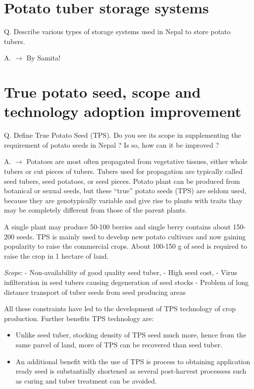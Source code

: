 \documentclass[
]{book}
\providecommand{\tightlist}{%
  \setlength{\itemsep}{0pt}\setlength{\parskip}{0pt}}
\begin{document}
\hypertarget{potato-tuber-storage-systems}{%
\section{Potato tuber storage systems}\label{potato-tuber-storage-systems}}

Q. Describe various types of storage systems used in Nepal to store potato tubers.

A. \(\longrightarrow\) By Samita!

\hypertarget{true-potato-seed-scope-and-technology-adoption-improvement}{%
\section{True potato seed, scope and technology adoption improvement}\label{true-potato-seed-scope-and-technology-adoption-improvement}}

Q. Define True Potato Seed (TPS). Do you see its scope in supplementing the requirement of potato seeds in Nepal ? Is so, how can it be improved ?

A. \(\longrightarrow\) Potatoes are most often propagated from vegetative tissues, either whole tubers or cut pieces of tubers. Tubers used for propagation are typically called seed tubers, seed potatoes, or seed pieces. Potato plant can be produced from botanical or sexual seeds, but these ``true'' potato seeds (TPS) are seldom used, because they are genotypically variable and give rise to plants with traits thay may be completely different from those of the parent plants.

A single plant may produce 50-100 berries and single berry contains about 150-200 seeds. TPS is mainly used to develop new potato cultivars and now gaining popularity to raise the commercial crops. About 100-150 g of seed is required to raise the crop in 1 hectare of land.

\emph{Scope}:
- Non-availability of good quality seed tuber,
- High seed cost,
- Virus infilteration in seed tubers causing degeneration of seed stocks
- Problem of long distance transport of tuber seeds from seed producing areas

All these constraints have led to the development of TPS technology of crop production. Further benefits TPS technology are:

\begin{itemize}
\tightlist
\item
  Unlike seed tuber, stocking density of TPS seed much more, hence from the same parcel of land, more of TPS can be recovered than seed tuber.
\item
  An additional benefit with the use of TPS is process to obtaining application ready seed is substantially shortened as several post-harvest processess such as curing and tuber treatment can be avoided.
\end{itemize}
\end{document}
